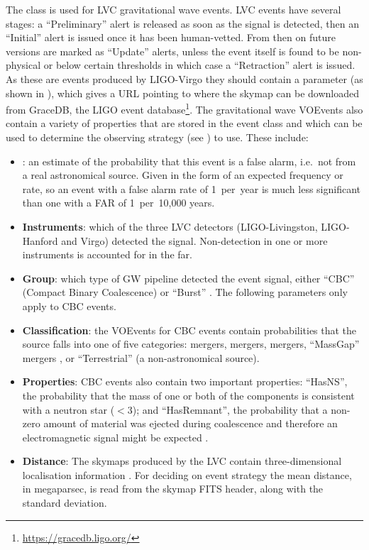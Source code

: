 \begin{colsection}
\begin{colsection}
The  class is used for LVC gravitational wave events. LVC events have several stages: a ``Preliminary'' alert is released as soon as the signal is detected, then an ``Initial'' alert is issued once it has been human-vetted. From then on future versions are marked as ``Update'' alerts, unless the event itself is found to be non-physical or below certain thresholds in which case a ``Retraction'' alert is issued. As these are events produced by LIGO-Virgo they should contain a  parameter (as shown in ), which gives a URL pointing to where the skymap can be downloaded from GraceDB, the LIGO event database\footnote{\url{https://gracedb.ligo.org/}}. The gravitational wave VOEvents also contain a variety of properties that are stored in the event class and which can be used to determine the observing strategy (see ) to use. These include:
\begin{itemize}
    \item \textbf{}: an estimate of the probability that this event is a false alarm, i.e.\ not from a real astronomical source. Given in the form of an expected frequency or rate, so an event with a false alarm rate of 1~per~year is much less significant than one with a FAR of 1~per~10,000 years.
    \item \textbf{Instruments}: which of the three LVC detectors (LIGO-Livingston, LIGO-Hanford and Virgo) detected the signal. Non-detection in one or more instruments is accounted for in the \gls{far}.
    \item \textbf{Group}: which type of GW pipeline detected the event signal, either ``CBC'' (Compact Binary Coalescence) or ``Burst'' \citep[other, unmodelled detections, see][]{GW_burst}. The following parameters only apply to CBC events.
    \item \textbf{Classification}: the VOEvents for CBC events contain probabilities that the source falls into one of five categories:  mergers,  mergers,  mergers, ``MassGap'' mergers \citep[one or other of the components is in the hypothetical ``mass gap'' between neutron stars and black holes, defined as 3--\SI{5}{\solarmass};][]{GW_MassGap}, or ``Terrestrial'' (a non-astronomical source).
    \item \textbf{Properties}: CBC events also contain two important properties: ``HasNS'', the probability that the mass of one or both of the components is consistent with a neutron star ($<$\SI{3}{\solarmass}); and ``HasRemnant'', the probability that a non-zero amount of material was ejected during coalescence and therefore an electromagnetic signal might be expected \citep{LVC_userguide}.
    \item \textbf{Distance}: The skymaps produced by the LVC contain three-dimensional localisation information \citep{GW_distance}. For deciding on event strategy the mean distance, in megaparsec, is read from the skymap FITS header, along with the standard deviation.
\end{itemize}


\end{colsection}
\end{colsection}
